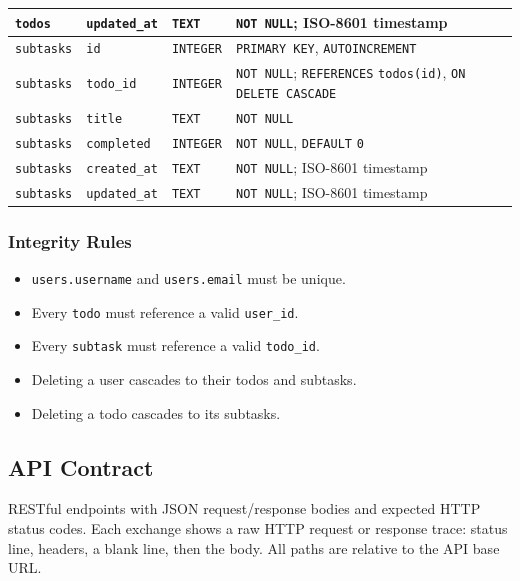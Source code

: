 \begin{table}[htbp]
\begin{tabularx}{\textwidth}{@{} l l l X @{}}
    \texttt{todos} & \texttt{updated\_at}    & \texttt{TEXT}    & \texttt{NOT NULL}; ISO-8601 timestamp \\
    \midrule
    \texttt{subtasks} & \texttt{id}          & \texttt{INTEGER} & \texttt{PRIMARY KEY}, \texttt{AUTOINCREMENT} \\
    \texttt{subtasks} & \texttt{todo\_id}    & \texttt{INTEGER} & \texttt{NOT NULL}; \texttt{REFERENCES} \texttt{todos(id)}, \texttt{ON DELETE CASCADE} \\
    \texttt{subtasks} & \texttt{title}       & \texttt{TEXT}    & \texttt{NOT NULL} \\
    \texttt{subtasks} & \texttt{completed}   & \texttt{INTEGER} & \texttt{NOT NULL}, \texttt{DEFAULT} \texttt{0} \\
    \texttt{subtasks} & \texttt{created\_at} & \texttt{TEXT}    & \texttt{NOT NULL}; ISO-8601 timestamp \\
    \texttt{subtasks} & \texttt{updated\_at} & \texttt{TEXT}    & \texttt{NOT NULL}; ISO-8601 timestamp \\
    \bottomrule
  \end{tabularx}
\end{table}

\subsubsection{Integrity Rules}
\begin{itemize}
  \item \texttt{users.username} and \texttt{users.email} must be unique.
  \item Every \texttt{todo} must reference a valid \texttt{user\_id}.
  \item Every \texttt{subtask} must reference a valid \texttt{todo\_id}.
  \item Deleting a user cascades to their todos and subtasks.
  \item Deleting a todo cascades to its subtasks.
\end{itemize}

\newpage
\subsection{API Contract}\label{sec:api}
RESTful endpoints with JSON request/response bodies and expected HTTP status codes.
Each exchange shows a raw HTTP request or response trace: status line, headers, a blank line, then the body.
All paths are relative to the API base URL.

